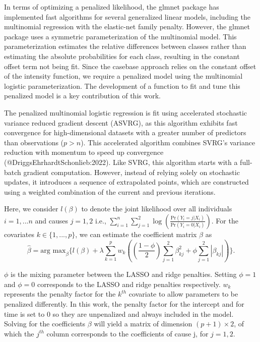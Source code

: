 \documentclass[AMA,Times1COL]{WileyNJDv5} %
\begin{document}
In terms of optimizing a penalized likelihood, the glmnet package has implemented fast algorithms for several generalized linear models, including the multinomial regression with the elastic-net family penalty. However, the glmnet package uses a symmetric parameterization of the multinomial model. This parameterization estimates the relative differences between classes rather than estimating the absolute probabilities for each class, resulting in the constant offset term not being fit. Since the casebase approach relies on the constant offset of the intensity function, we require a penalized model using the multinomial logistic parameterization. The development of a function to fit and tune this penalized model is a key contribution of this work.

The penalized multinomial logistic regression is fit using accelerated stochastic variance reduced gradient descent (ASVRG), as this algorithm exhibits fast convergence for high-dimensional datasets with a greater number of predictors than observations ($p> n$). This accelerated algorithm combines SVRG's variance reduction with momentum to speed up convergence (@DriggsEhrhardtSchonlieb:2022). Like SVRG, this algorithm starts with a full-batch gradient computation. However, instead of relying solely on stochastic updates, it introduces a sequence of extrapolated points, which are constructed using a weighted combination of the current and previous iterations.

Here, we consider $l(\beta)$ to denote the joint likelihood over all individuals $i=1,...n$ and causes $j=1,2$ i.e., $\sum_{i=1}^{n}\sum_{j=1}^{2}\log(\frac{\text{Pr}(Y_{i}=j|X_{i})}{\text{Pr}(Y_{i}=0|X_{i})})$. For the covariates $k\in\{1,...,p\}$, we can estimate the coefficient matrix $\beta$ as 
$$\hat{\beta}=\text{arg max}_{\beta}\{l(\beta)+\lambda\sum_{k=1}^{p}w_{k}((\frac{1-\phi}{2})\sum_{j=1}^{2}\beta_{kj}^{2}+\phi\sum_{j=1}^{2}|\beta_{kj}|)\}.$$

$\phi$ is the mixing parameter between the LASSO and ridge penalties. Setting $\phi=1$ and $\phi=0$ corresponds to the LASSO and ridge penalties respectively. $w_{k}$ represents the penalty factor for the $k^{th}$ covariate to allow parameters to be penalized differently. In this work, the penalty factor for the intercept and for time is set to 0 so they are unpenalized and always included in the model. Solving for the coefficients $\beta$ will yield a matrix of dimension $(p+1)\times2$, of which the $j^{th}$ column corresponds to the coefficients of cause j, for $j=1,2$.
\end{document}

